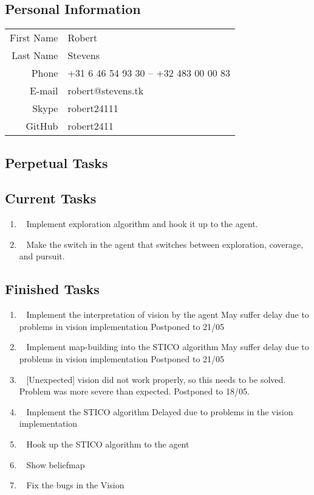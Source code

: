 \subsection{Personal Information}
\begin{table}[h!]
	\begin{tabular}{rl}
	First Name 	& Robert\\
	Last Name	& Stevens\\
	Phone		& +31 6 46 54 93 30 -- +32 483 00 00 83\\
	E-mail		& robert@stevens.tk\\
	Skype		& robert24111\\
	GitHub		& robert2411
\end{tabular}
\end{table}
    
\subsection{Perpetual Tasks}
	
\subsection{Current Tasks}
	\begin{enumerate}
		\item~
			Implement exploration algorithm and hook it up to the agent.
		\item~
			Make the switch in the agent that switches between exploration, coverage, and pursuit.
	\end{enumerate}
    
\subsection{Finished Tasks}
	\begin{enumerate}
		\item~
		Implement the interpretation of vision by the agent
			\subitem May suffer delay due to problems in vision implementation
			\subitem Postponed to 21/05
		\item~
		Implement map-building into the STICO algorithm
			\subitem May suffer delay due to problems in vision implementation
			\subitem Postponed to 21/05
		\item~
		[Unexpected] vision did not work properly, so this needs to be solved.
			\subitem Problem was more severe than expected. Postponed to 18/05.
		\item~
		Implement the STICO algorithm
			\subitem Delayed due to problems in the vision implementation
		\item~
		Hook up the STICO algorithm to the agent
		\item~\marginpar{-}
			Show beliefmap
		\item~
			Fix the bugs in the Vision
	\end{enumerate}
